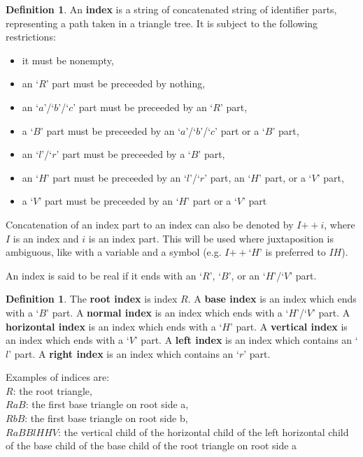 \documentclass[a4paper,12pt]{article}
\newcommand\doubleplus{\mathbin{+\!+}}
\newcommand{\HSindexpart}[1]{\text{`}#1\text{'}}
\theoremstyle{definition}
\newtheorem{definition}[theorem]{Definition}
\theoremstyle{plain}
\begin{document}
	\begin{definition}
		An \textbf{index} is a string of concatenated string of identifier parts, representing a path taken in a triangle tree.
		It is subject to the following restrictions:\begin{itemize}
			\item it must be nonempty,
			\item an `$R$' part must be preceeded by nothing,
			\item an `$a$'/`$b$'/`$c$' part must be preceeded by an `$R$' part,
			\item a `$B$' part must be preceeded by an `$a$'/`$b$'/`$c$' part or a `$B$' part,
			\item an `$l$'/`$r$' part must be preceeded by a `$B$' part,
			\item an `$H$' part must be preceeded by an `$l$'/`$r$' part, an `$H$' part, or a `$V$' part,
			\item a `$V$' part must be preceeded by an `$H$' part or a `$V$' part
		\end{itemize}

		Concatenation of an index part to an index can also be denoted by $I \doubleplus i$, where $I$ is an index and $i$ is an index part.
		This will be used where juxtaposition is ambiguous, like with a variable and a symbol (e.g. $I \doubleplus \HSindexpart{H}$ is preferred to $IH$).

		An index is said to be real if it ends with an `$R$', `$B$', or an `$H$'/`$V$' part.
	\end{definition}

	\begin{definition}
		The \textbf{root index} is index $R$.
		A \textbf{base index} is an index which ends with a `$B$' part.
		A \textbf{normal index} is an index which ends with a `$H$'/`$V$' part.
		A \textbf{horizontal index} is an index which ends with a `$H$' part.
		A \textbf{vertical index} is an index which ends with a `$V$' part.
		A \textbf{left index} is an index which contains an `$l$' part.
		A \textbf{right index} is an index which contains an `$r$' part.
	\end{definition}

	Examples of indices are:\\
	$R$: the root triangle,\\
	$RaB$: the first base triangle on root side a,\\
	$RbB$: the first base triangle on root side b,\\
	$RaBBlHHV$: the vertical child of the horizontal child of the left horizontal child of the base child of the base child of the root triangle on root side a
	
\end{document}
